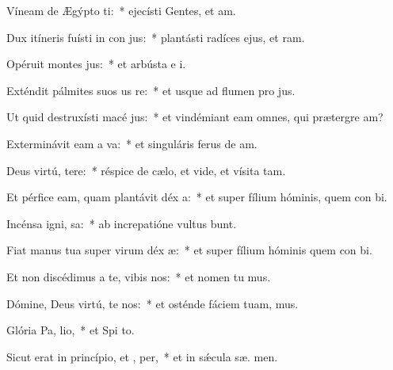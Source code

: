 \item Víneam de Ægýpto ti:~* ejecísti Gentes, et  am.
\item Dux itíneris fuísti in con jus:~* plantásti radíces ejus, et  ram.
\item Opéruit montes  jus:~* et arbústa e  i.
\item Exténdit pálmites suos us  re:~* et usque ad flumen pro jus.
\item Ut quid destruxísti macé jus:~* et vindémiant eam omnes, qui prætergre am?
\item Exterminávit eam a  va:~* et singuláris ferus de  am.
\item Deus virtú, tere:~* réspice de cælo, et vide, et vísita  tam.
\item Et pérfice eam, quam plantávit déx a:~* et super fílium hóminis, quem con bi.
\item Incénsa igni,  sa:~* ab increpatióne vultus  bunt.
\item Fiat manus tua super virum déx æ:~* et super fílium hóminis quem con bi.
\item Et non discédimus a te, vibis nos:~* et nomen tu mus.
\item Dómine, Deus virtú, te nos:~* et osténde fáciem tuam,   mus.
\item Glória Pa,  lio,~* et Spi to.
\item Sicut erat in princípio, et ,  per,~* et in sǽcula sæ. men.
